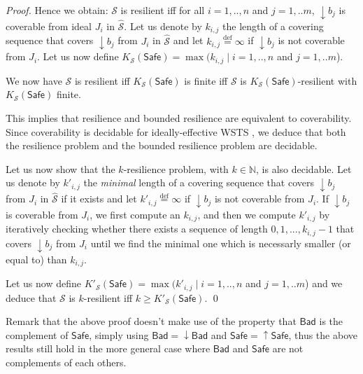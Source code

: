 \documentclass[runningheads]{llncs}
\newcommand{\Bad}{\textsf{Bad}}
\newcommand{\Safe}{\textsf{Safe}}
\begin{document}
\begin{proof}
Hence we obtain: $\mathscr{S}$ is resilient iff for all $i=1,..,n$ and $j= 1,..m$, $\downarrow b_j$ is coverable from ideal $J_i$ in $\hat{\mathscr{S}}$.
%
Let us denote by $k_{i,j}$ the length of a covering sequence that covers $\downarrow b_j$ from $J_i$ in $\hat{\mathscr{S}}$ and let $k_{i,j}\stackrel{\text{def}}{=}\infty$ if $\downarrow b_j$ is not coverable from $J_i$. Let us now define $K_{\mathscr{S}}(\Safe)=\max(k_{i,j} \mid i=1,..,n$ and $j= 1,..m$).
%

%
We now have $\mathscr{S}$ is resilient iff $K_{\mathscr{S}}(\Safe)$ is finite iff $\mathscr{S}$ is $K_{\mathscr{S}}(\Safe)$-resilient with $K_{\mathscr{S}}(\Safe)$ finite.

This implies that resilience and bounded resilience are equivalent to coverability.
Since coverability is decidable for ideally-effective WSTS \cite{BFM-ic17}, we deduce that both the 
  resilience problem and the bounded resilience problem are decidable.



Let us now show that the $k$-resilience problem, with $k \in \mathbb{N}$, is also decidable.
Let us denote by $k'_{i,j}$ the \emph{minimal} length of a covering sequence that covers $\downarrow b_j$ from $J_i$ in $\hat{\mathscr{S}}$ if it exists and let $k'_{i,j}\stackrel{\text{def}}{=}\infty$ if $\downarrow b_j$ is not coverable from $J_i$. 
If $\downarrow b_j$ is coverable from $J_i$, we first compute an $k_{i,j}$, and then we compute $k'_{i,j}$ by iteratively checking whether there exists a sequence of length $0,1,...,k_{i,j}-1$ that covers $\downarrow b_j$ from $J_i$ until we find the minimal one which is necessarly smaller (or equal to) than $k_{i,j}$.

Let us now define $K'_{\mathscr{S}}(\Safe)=\max(k'_{i,j} \mid i=1,..,n$ and $j= 1,..m$) and we deduce that  $\mathscr{S}$ is $k$-resilient iff $k \geq K'_{\mathscr{S}}(\Safe)$. \qed
\end{proof}


Remark that the above proof doesn't make use of the 
property that $\Bad$ is the complement of $\Safe$, simply using
$\Bad=\downarrow \Bad$ and $\Safe=\uparrow \Safe$, thus 
the above results still hold in the more general case where $\Bad$ and $\Safe$ are not complements of each others.
\end{document}
